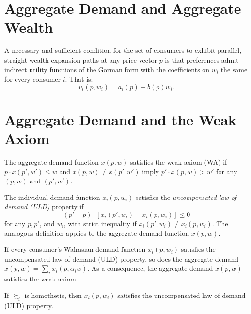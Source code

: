 \addtocounter{section}{1}

\section{Aggregate Demand and Aggregate Wealth}

\begin{prop}
    A necessary and sufficient condition for the set of consumers to exhibit parallel, straight wealth expansion paths at any price vector $p$ is that preferences admit indirect utility functions of the Gorman form with the coefficients on $w_i$ the same for every consumer $i$. That is:
    \begin{equation*}
        v_i(p, w_i) = a_i (p) + b(p)w_i.
    \end{equation*}
\end{prop}


\section{Aggregate Demand and the Weak Axiom}

\begin{defn}
    The aggregate demand function $x(p, w)$ satisfies the weak axiom (WA) if $p \cdot x(p', w') \leq w$ and $x(p, w) \neq x(p', w')$ imply $p' \cdot x(p, w) > w'$ for any $(p, w)$ and $(p', w')$.
\end{defn}

\begin{defn}
    The individual demand function $x_i(p, w_i)$ satisfies the \emph{uncompensated law of demand (ULD)} property if
    \begin{equation*}
        (p' - p) \cdot \left[x_i(p', w_i) - x_i(p, w_i) \right] \leq 0
    \end{equation*}
    for any $p, p'$, and $w_i$, with strict inequality if $x_i(p', w_i) \neq x_i(p, w_i)$. The analogous definition applies to the aggregate demand function $x(p, w)$.
\end{defn}

\begin{prop}
    If every consumer's Walrasian demand function $x_i(p, w_i)$ satisfies the uncompensated law of demand (ULD) property, so does the aggregate demand $x(p, w) = \sum_i x_i(p, \alpha_i w)$. As a consequence, the aggregate demand $x(p, w)$ satisfies the weak axiom.
\end{prop}

\begin{prop}
    If $\succsim_i$ is homothetic, then $x_i(p, w_i)$ satisfies the uncompensated law of demand (ULD) property.
\end{prop}


